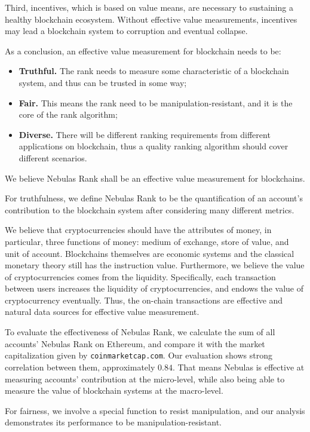 Third, incentives, which is based on value means, are necessary to sustaining a healthy blockchain ecosystem. Without effective value measurements, incentives may lead a blockchain system to corruption and eventual collapse.

As a conclusion, an effective value measurement for blockchain needs to be:
\begin{itemize}
\item{\textbf{Truthful.}} The rank needs to measure some characteristic of a blockchain system, and thus can be trusted in some way;
\item{\textbf{Fair.}} This means the rank need to be manipulation-resistant, and it is the core of the rank algorithm;
\item{\textbf{Diverse.}} There will be different ranking requirements from different applications on blockchain, thus a quality ranking algorithm should cover different scenarios.
\end{itemize}

We believe Nebulas Rank shall be an effective value measurement for
blockchains.

For truthfulness, we define Nebulas Rank to be the quantification of an account's
contribution to the blockchain system after considering many different
metrics.

We believe that cryptocurrencies should have the attributes of money, in particular,
three functions of money: medium of exchange, store of value, and unit of
account. Blockchains themselves are economic systems and the classical monetary theory still has the instruction value. Furthermore, we believe the value of cryptocurrencies comes from the liquidity. Specifically, each transaction between users increases the liquidity of cryptocurrencies, and endows the value of cryptocurrency eventually. Thus, the on-chain transactions are effective and natural data sources for effective value measurement.


To evaluate the effectiveness of Nebulas Rank, we calculate the sum of all
accounts' Nebulas Rank on Ethereum, and compare it with the market capitalization
given by \texttt{coinmarketcap.com}. Our evaluation shows strong
correlation between them, approximately $0.84$. That means Nebulas is effective at measuring
accounts' contribution at the micro-level, while also being able to measure the
value of blockchain systems at the macro-level.

For fairness, we involve a special function to resist manipulation, and our analysis demonstrates its performance to be manipulation-resistant.

